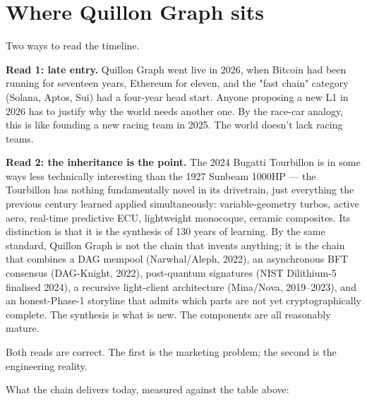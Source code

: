 \documentclass[11pt,a4paper]{article}
\begin{document}
\section{Where Quillon Graph sits}

Two ways to read the timeline.

\textbf{Read 1: late entry.} Quillon Graph went live in 2026, when
Bitcoin had been running for seventeen years, Ethereum for eleven, and
the "fast chain" category (Solana, Aptos, Sui) had a four-year head
start. Anyone proposing a new L1 in 2026 has to justify why the world
needs another one. By the race-car analogy, this is like founding a new
racing team in 2025. The world doesn't lack racing teams.

\textbf{Read 2: the inheritance is the point.} The 2024 Bugatti Tourbillon
is in some ways less technically interesting than the 1927 Sunbeam
1000HP --- the Tourbillon has nothing fundamentally novel in
its drivetrain, just everything the previous century learned applied
simultaneously: variable-geometry turbos, active aero, real-time
predictive ECU, lightweight monocoque, ceramic composites. Its
distinction is that it is the synthesis of 130 years of learning. By
the same standard, Quillon Graph is not the chain that invents anything;
it is the chain that combines a DAG mempool (Narwhal/Aleph, 2022), an
asynchronous BFT consensus (DAG-Knight, 2022), post-quantum signatures
(NIST Dilithium-5 finalised 2024), a recursive light-client architecture
(Mina/Nova, 2019--2023), and an honest-Phase-1 storyline that admits
which parts are not yet cryptographically complete. The synthesis is
what is new. The components are all reasonably mature.

Both reads are correct. The first is the marketing problem; the second
is the engineering reality.

What the chain delivers today, measured against the table above:
\end{document}
